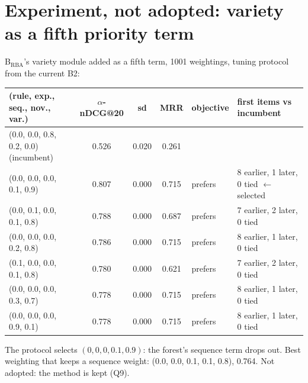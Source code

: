 \documentclass[10.5pt,a4paper]{article}
\begin{document}
\section{Experiment, not adopted: variety as a fifth priority term}
B$_\mathrm{RBA}$'s variety module added as a fifth term, 1001 weightings, tuning protocol from the current B2:
\begin{center}\small
\begin{tabular}{@{}l c c c l l@{}}
\toprule
(rule, exp., seq., nov., var.) & $\alpha$-nDCG@20 & sd & MRR & objective & first items vs incumbent \\
\midrule
(0.0, 0.0, 0.8, 0.2, 0.0) (incumbent) & 0.526 & 0.020 & 0.261 & & \\
(0.0, 0.0, 0.0, 0.1, 0.9) & 0.807 & 0.000 & 0.715 & prefers & 8 earlier, 1 later, 0 tied $\leftarrow$ selected \\
(0.0, 0.1, 0.0, 0.1, 0.8) & 0.788 & 0.000 & 0.687 & prefers & 7 earlier, 2 later, 0 tied \\
(0.0, 0.0, 0.0, 0.2, 0.8) & 0.786 & 0.000 & 0.715 & prefers & 8 earlier, 1 later, 0 tied \\
(0.1, 0.0, 0.0, 0.1, 0.8) & 0.780 & 0.000 & 0.621 & prefers & 7 earlier, 2 later, 0 tied \\
(0.0, 0.0, 0.0, 0.3, 0.7) & 0.778 & 0.000 & 0.715 & prefers & 8 earlier, 1 later, 0 tied \\
(0.0, 0.0, 0.0, 0.9, 0.1) & 0.778 & 0.000 & 0.715 & prefers & 8 earlier, 1 later, 0 tied \\
\bottomrule
\end{tabular}
\end{center}
The protocol selects $(0, 0, 0, 0.1, 0.9)$: the forest's sequence term drops out. Best weighting that keeps a sequence weight: (0.0, 0.0, 0.1, 0.1, 0.8), 0.764. Not adopted: the method is kept (Q9).
\end{document}
